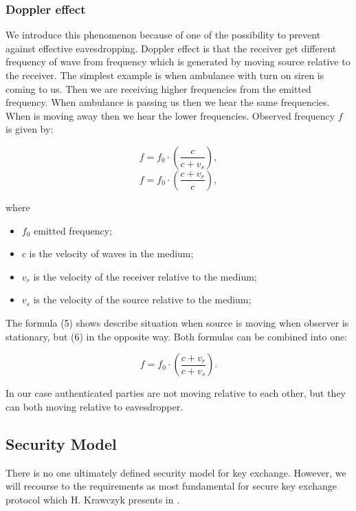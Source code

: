 \documentclass[11pt,titlepage]{article}
\theoremstyle{plain}
\begin{document}
\subsubsection{Doppler effect}
We introduce this phenomenon because of one of the possibility to prevent against effective
eavesdropping. Doppler effect is that the receiver get different frequency of wave from frequency which is generated by moving source relative to the receiver. The simplest example
is when ambulance with turn on siren is coming to us. Then we are receiving higher frequencies
from the emitted frequency. When ambulance is passing us then we hear the same
frequencies. When is moving away then we hear the lower frequencies. Observed frequency $f$ is given by:

\begin{equation}
	f = f_{0} \cdot \left(\frac {c}{c + v_{s}}\right),
\end{equation}
\begin{equation}
	f = f_{0} \cdot \left(\frac {c + v_{r}}{c}\right),
\end{equation}

where

\begin{itemize}
\item $f_0$ emitted frequency;
\item $c$ is the velocity of waves in the medium;
\item $v_r$ is the velocity of the receiver relative to the medium;
\item $v_s$ is the velocity of the source relative to the medium;
\end{itemize}

The formula (5) shows describe situation when source is moving when observer is stationary, but (6) in the opposite way. Both formulas can be combined into one:

\begin{equation}
	f = f_{0} \cdot \left(\frac {c + v_{r}}{c + v_{s}}\right).
\end{equation}

In our case authenticated parties are not moving relative to each other, but they can both moving relative to eavesdropper.

\subsection{Security Model}
There is no one ultimately defined security model for key exchange. However, we will recourse to the requirements as most fundamental for secure key exchange protocol which H. Krawczyk presents in \cite{sign_mac}.
\end{document}
